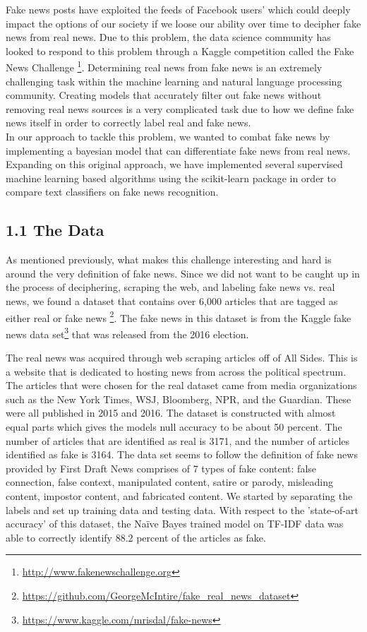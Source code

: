 \documentclass{neu_handout}
\begin{document}
Fake news posts have exploited the feeds of Facebook users' which could deeply impact the options of our society if we loose our ability over time to decipher fake news from real news. Due to this problem, the data science community has looked to respond to this problem through a Kaggle competition called the Fake News Challenge \footnote{\url{http://www.fakenewschallenge.org}}. Determining real news from fake news is an extremely challenging task within the machine learning and natural language processing community. Creating models that accurately filter out fake news without removing real news sources is a very complicated task due to how we define fake news itself in order to correctly label real and fake news.\\

In our approach to tackle this problem, we wanted to combat fake news by implementing a bayesian model that can differentiate fake news from real news. Expanding on this original approach, we have implemented several supervised machine learning based algorithms using the scikit-learn package in order to compare text classifiers on fake news recognition. 


\subsection*{1.1 The Data}
As mentioned previously, what makes this challenge interesting and hard is around the very definition of fake news. Since we did not want to be caught up in the process of deciphering, scraping the web, and labeling fake news vs. real news, we found a dataset that contains over 6,000 articles that are tagged as either real or fake news \footnote{\url{https://github.com/GeorgeMcIntire/fake_real_news_dataset}}. The fake news in this dataset is from the Kaggle fake news data set\footnote{\url{https://www.kaggle.com/mrisdal/fake-news}} that was released from the 2016 election.

The real news was acquired through web scraping articles off of All Sides. This is a website that is dedicated to hosting news from across the political spectrum. The articles that were chosen for the real dataset came from media organizations such as the New York Times, WSJ, Bloomberg, NPR, and the Guardian. These were all published in 2015 and 2016. The dataset is constructed with almost equal parts which gives the models null accuracy to be about 50 percent. The number of articles that are identified as real is 3171, and the number of articles identified as fake is 3164. The data set seems to follow the definition of fake news provided by First Draft News comprises of 7 types of fake content: false connection, false context, manipulated content, satire or parody, misleading content, impostor content, and fabricated content. We started by separating the labels and set up training data and testing data. With respect to the 'state-of-art accuracy' of this dataset, the Na\"ive Bayes trained model on TF-IDF data was able to correctly identify 88.2 percent of the articles as fake. 
\end{document}
